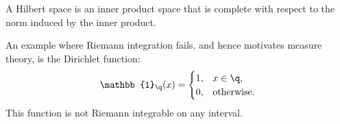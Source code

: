\begin{definition}
    A Hilbert space is an inner product space that is complete with respect to the norm induced by the inner product.
\end{definition}

\begin{remark}
    An example where Riemann integration fails, and hence motivates measure theory, is the Dirichlet function:
    \[
        \mathbb{1}_{\q}(x) =
        \begin{cases}
            1, & x\in\q,\\
            0, & \text{otherwise.}
        \end{cases}
    \]
    This function is not Riemann integrable on any interval.
\end{remark}